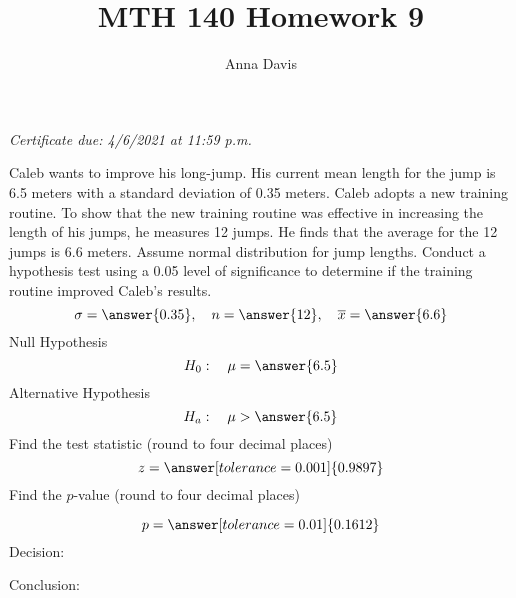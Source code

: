 \documentclass{ximera}
\author{Anna Davis} \title{MTH 140 Homework 9}
\begin{document}
\begin{abstract}

\end{abstract}
\maketitle
 \textit{Certificate due: 4/6/2021 at 11:59 p.m.}
 \begin{problem}\label{prob:140hom9prob4}
Caleb wants to improve his long-jump.  His current mean length for the jump is 6.5 meters with a standard deviation of 0.35 meters.  Caleb adopts a new training routine.  To show that the new training routine was effective in increasing the length of his jumps, he measures 12 jumps. He finds that the average for the 12 jumps is 6.6 meters.  Assume normal distribution for jump lengths.  Conduct a hypothesis test using a 0.05 level of significance to determine if the training routine improved Caleb's results.
$$\sigma=\answer{0.35},\quad n=\answer{12},\quad \overline{x}=\answer{6.6}$$
Null Hypothesis
$$H_0:\quad \mu=\answer{6.5}$$
Alternative Hypothesis
$$H_a:\quad \mu>\answer{6.5}$$
Find the test statistic (round to four decimal places)
$$z=\answer[tolerance=0.001]{0.9897}$$
Find the $p$-value (round to four decimal places)
\begin{center}  
\end{center}
$$p=\answer[tolerance=0.01]{0.1612}$$
Decision:

\begin{multipleChoice} 
\end{multipleChoice}  

Conclusion:

\begin{multipleChoice} 
\end{multipleChoice} 
\end{problem}
\end{document}
